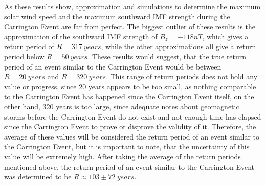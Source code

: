 \documentclass[12pt]{article}
\begin{document}
        As these results show, approximation and simulations to determine the maximum solar wind speed and the maximum southward IMF strength during the Carrington Event are far from perfect. The biggest outlier of these results is the approximation of the southward IMF strength of $B_z=-118nT$, which gives a return period of $R=317\ years$, while the other approximations all give a return period below $R=50\ years$. These results would suggest, that the true return period of an event similar to the Carrington Event would be between $R=20\ years$ and $R=320\ years$. This range of return periods does not hold any value or progress, since 20 years appears to be too small, as nothing comparable to the Carrington Event has happened since the Carrington Event itself, on the other hand, 320 years is too large, since adequate notes about geomagnetic storms before the Carrington Event do not exist and not enough time has elapsed since the Carrington Event to prove or disprove the validity of it. Therefore, the average of these values will be considered the return period of an event similar to the Carrington Event, but it is important to note, that the uncertainty of this value will be extremely high. After taking the average of the return periods mentioned above, the return period of an event similar to the Carrington Event was determined to be $R\approx 103\pm 72\ years$.
\end{document}
